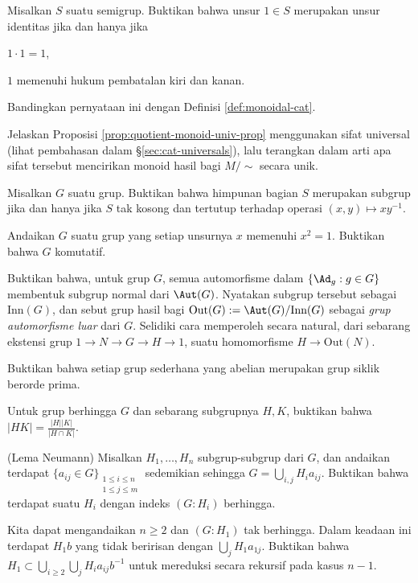 \begin{Exercises}
	\item Misalkan $S$ suatu semigrup. Buktikan bahwa unsur $1 \in S$ merupakan unsur identitas jika dan hanya jika
		\begin{inparaenum}[(i)]
			\item $1 \cdot 1 = 1$,
			\item $1$ memenuhi hukum pembatalan kiri dan kanan.
		\end{inparaenum}
		Bandingkan pernyataan ini dengan Definisi \ref{def:monoidal-cat}.
	\item Jelaskan Proposisi \ref{prop:quotient-monoid-univ-prop} menggunakan sifat universal (lihat pembahasan dalam \S\ref{sec:cat-universals}), lalu terangkan dalam arti apa sifat tersebut mencirikan monoid hasil bagi $M/\sim$ secara unik.
	\item Misalkan $G$ suatu grup. Buktikan bahwa himpunan bagian $S$ merupakan subgrup jika dan hanya jika $S$ tak kosong dan tertutup terhadap operasi $(x,y) \mapsto xy^{-1}$.
	\item Andaikan $G$ suatu grup yang setiap unsurnya $x$ memenuhi $x^2=1$. Buktikan bahwa $G$ komutatif.
	\item Buktikan bahwa, untuk grup $G$, semua automorfisme dalam $\{\Ad_g: g \in G\}$ membentuk subgrup normal dari $\Aut(G)$. Nyatakan subgrup tersebut sebagai $\text{Inn}(G)$, dan sebut grup hasil bagi $\text{Out}(G) := \Aut(G)/\text{Inn}(G)$ sebagai \emph{grup automorfisme luar} dari $G$. Selidiki cara memperoleh secara natural, dari sebarang ekstensi grup $1 \to N \to G \to H \to 1$, suatu homomorfisme $H \to \text{Out}(N)$. 
	\item Buktikan bahwa setiap grup sederhana yang abelian merupakan grup siklik berorde prima.
	\item Untuk grup berhingga $G$ dan sebarang subgrupnya $H, K$, buktikan bahwa $|HK| = \frac{|H||K|}{|H \cap K|}$.
	\item (Lema Neumann) Misalkan $H_1, \ldots, H_n$ subgrup-subgrup dari $G$, dan andaikan terdapat $\{ a_{ij} \in G \}_{\substack{1 \leq i \leq n \\ 1 \leq j \leq m}}$ sedemikian sehingga $G = \bigcup_{i,j} H_i a_{ij}$. Buktikan bahwa terdapat suatu $H_i$ dengan indeks $(G:H_i)$ berhingga.
	\begin{hint} Kita dapat mengandaikan $n \geq 2$ dan $(G:H_1)$ tak berhingga. Dalam keadaan ini terdapat $H_1 b$ yang tidak beririsan dengan $\bigcup_j H_1 a_{1j}$. Buktikan bahwa $H_1 \subset \bigcup_{i \geq 2} \bigcup_j H_i a_{ij} b^{-1}$ untuk mereduksi secara rekursif pada kasus $n-1$.\end{hint}

\end{Exercises}
